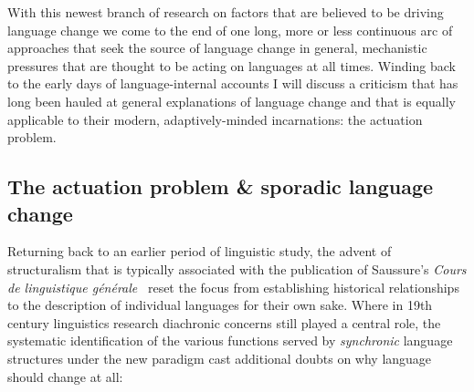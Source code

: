 


With this newest branch of research on factors that are believed to be driving language change we come to the end of one long, more or less continuous arc of approaches that seek the source of language change in general, mechanistic pressures that are thought to be acting on languages at all times. Winding back to the early days of language-internal accounts I will discuss a criticism that has long been hauled at general explanations of language change and that is equally applicable to their modern, adaptively-minded incarnations: the actuation problem.

\subsection{The actuation problem \& sporadic language change}
\label{sec:actuationproblem}

Returning back to an earlier period of linguistic study, the advent of structuralism that is typically associated with the publication of Saussure's \emph{Cours de linguistique générale}~\citeyearpar{Saussure1916} reset the focus from establishing historical relationships to the description of individual languages for their own sake. %
Where in 19th century linguistics research diachronic concerns still played a central role, the systematic identification of the various functions served by \emph{synchronic} language structures under the new paradigm cast additional doubts on why language should change at all:

